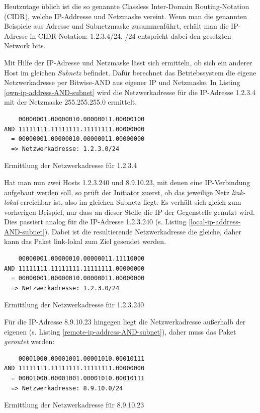 Heutzutage üblich ist die so genannte Classless Inter-Domain Routing-Notation (\gls{CIDR}), welche IP-Addresse und Netzmaske vereint. Wenn man die genannten Beispiele aus Adresse und Subnetzmaske zusammenführt, erhält man die IP-Adresse in \gls{CIDR}-Notation: 1.2.3.4/24. /24 entspricht dabei den gesetzten Network bits.

Mit Hilfe der IP-Adresse und Netzmaske lässt sich ermitteln, ob sich ein anderer Host im gleichen \textit{Subnetz} befindet. Dafür berechnet das Betriebssystem die eigene Netzwerkadresse per Bitwise-AND aus eigener IP und Netzmaske. In Listing \ref{own-ip-address-AND-subnet} wird die Netzwerkadresse für die IP-Adresse 1.2.3.4 mit der Netzmaske 255.255.255.0 ermittelt.
\begin{listing}[h]
\begin{verbatim}
    00000001.00000010.00000011.00000100
AND 11111111.11111111.11111111.00000000
  = 00000001.00000010.00000011.00000000
  => Netzwerkadresse: 1.2.3.0/24
\end{verbatim}
\caption{Ermittlung der Netzwerkadresse für 1.2.3.4}
\label{own-ip-address-AND-subnet}
\end{listing}\FloatBarrier
Hat man nun zwei Hosts 1.2.3.240 und 8.9.10.23, mit denen eine IP-Verbindung aufgebaut werden soll, so prüft der Initiator zuerst, ob das jeweilige Netz \textit{link-lokal} erreichbar ist, also im gleichen Subnetz liegt. Es verhält sich gleich zum vorherigen Beispiel, nur dass an dieser Stelle die IP der Gegenstelle genutzt wird.\\
Dies passiert analog für die IP-Adresse 1.2.3.240 (s. Listing \ref{local-ip-address-AND-subnet}). Dabei ist die resultierende Netzwerkadresse die gleiche, daher kann das Paket link-lokal zum Ziel gesendet werden.

\begin{listing}[h]
\begin{verbatim}
    00000001.00000010.00000011.11110000
AND 11111111.11111111.11111111.00000000
  = 00000001.00000010.00000011.00000000
  => Netzwerkadresse: 1.2.3.0/24
\end{verbatim}
\caption{Ermittlung der Netzwerkadresse für 1.2.3.240}
\label{local-ip-address-AND-subnet}
\end{listing}\FloatBarrier

Für die IP-Adresse 8.9.10.23\label{ip_ausserhalb} hingegen liegt die Netzwerkadresse außerhalb der eigenen (s. Listing \ref{remote-ip-address-AND-subnet}), daher muss das Paket \textit{geroutet} werden:
\begin{listing}[h]
\begin{verbatim}
    00001000.00001001.00001010.00010111
AND 11111111.11111111.11111111.00000000
  = 00001000.00001001.00001010.00010111
  => Netzwerkadresse: 8.9.10.0/24
\end{verbatim}
\caption{Ermittlung der Netzwerkadresse für 8.9.10.23}
\label{remote-ip-address-AND-subnet}
\end{listing}\FloatBarrier

